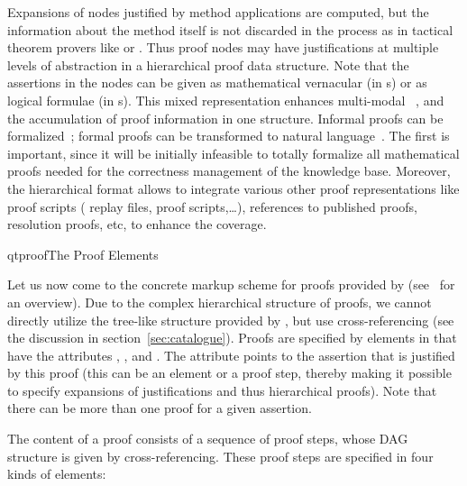 Expansions of nodes justified by method applications are computed, but the
information about the method itself is not discarded in the process as in tactical
theorem provers like {\isabelle} or {\nuprl}.  Thus proof nodes may have
justifications at multiple levels of abstraction in a hierarchical proof data
structure. Note that the assertions in the nodes can be given as mathematical
vernacular (in {s}) or as logical formulae (in {s}).
This mixed representation enhances multi-modal {}~\cite{Fiedler:tape97}, and the accumulation of proof
information in one structure. Informal proofs can be
formalized~\cite{Baur:susmt99}; formal proofs can be transformed to natural
language~\cite{HuangFiedler:pmfp96}. The first is important, since it will be
initially infeasible to totally formalize all mathematical proofs needed for the
correctness management of the knowledge base. Moreover, the hierarchical format
allows to integrate various other proof representations like proof scripts
({\OMEGA} replay files, {} proof scripts,\ldots), references to
published proofs, resolution proofs, etc, to enhance the coverage.

\begin{myfig}{qtproof}{The {\omdoc} Proof Elements}
  \quicktable{\prooftable{}}
\end{myfig}

Let us now come to the concrete markup scheme for proofs provided by {\omdoc}
(see~ for an overview). Due to the complex hierarchical structure of
proofs, we cannot directly utilize the tree-like structure provided by {\xml}, but use
cross-referencing (see the discussion in section~\ref{sec:catalogue}). Proofs are
specified by {} elements in {\omdoc} that have the attributes
{}, {}, and {}. The
{} attribute points to the assertion that is justified by this proof
(this can be an {} element or a {} proof step, thereby
making it possible to specify expansions of justifications and thus hierarchical
proofs). Note that there can be more than one proof for a given assertion.

The content of a proof consists of a sequence of proof steps, whose DAG structure
is given by cross-referencing. These proof steps are specified in four kinds of
{\omdoc} elements:

